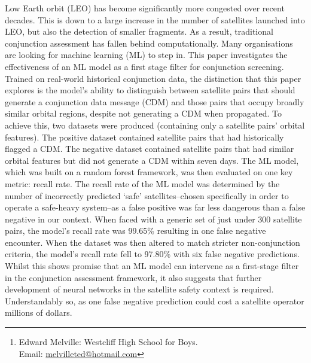 \documentclass[letterpaper,11pt,leqno]{article}
\begin{document}
\title{}

\author{Edward Melville%
\thanks{%
Edward Melville: Westcliff High School for Boys.\\
Email: \href{mailto:melvilleted@hotmail.com}{melvilleted@hotmail.com}%
}%
}

\date{October 2026}   


\begin{titlepage}
\maketitle




Low Earth orbit (LEO) has become significantly more congested over recent decades. This is down to a large increase in the number of satellites launched into LEO, but also the detection of smaller fragments. As a result, traditional conjunction assessment has fallen behind computationally. Many organisations are looking for machine learning (ML) to step in. This paper investigates the effectiveness of an ML model as a first stage filter for conjunction screening. Trained on real-world historical conjunction data, the distinction that this paper explores is the model's ability to distinguish between satellite pairs that should generate a conjunction data message (CDM) and those pairs that occupy broadly similar orbital regions, despite not generating a CDM when propagated. To achieve this, two datasets were produced (containing only a satellite pairs' orbital features). The positive dataset contained satellite pairs that had historically flagged a CDM. The negative dataset contained satellite pairs that had similar orbital features but did not generate a CDM within seven days. The ML model, which was built on a random forest framework, was then evaluated on one key metric: recall rate. The recall rate of the ML model was determined by the number of incorrectly predicted `safe' satellites--chosen specifically in order to operate a safe-heavy system--as a false positive was far less dangerous than a false negative in our context. When faced with a generic set of just under 300 satellite pairs, the model's recall rate was 99.65\% resulting in one false negative encounter. When the dataset was then altered to match stricter non-conjunction criteria, the model's recall rate fell to 97.80\% with six false negative predictions. Whilst this shows promise that an ML model can intervene as a first-stage filter in the conjunction assessment framework, it also suggests that further development of neural networks in the satellite safety context is required. Understandably so, as one false negative prediction could cost a satellite operator millions of dollars. 

\end{titlepage}
\end{document}
